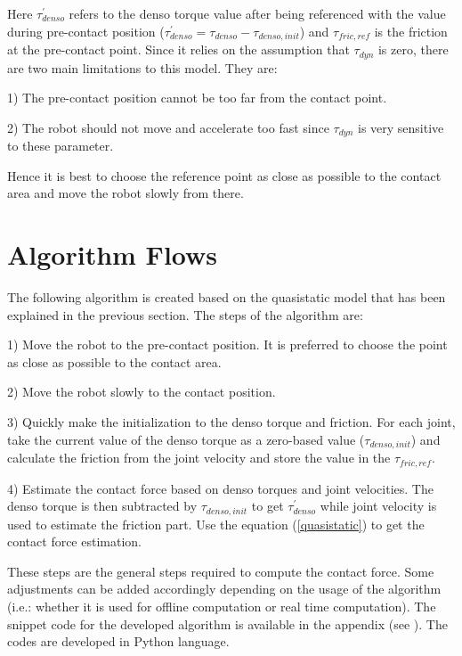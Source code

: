 Here $\tau_{denso}^{\prime}$ refers to the denso torque value after being referenced with the value during pre-contact position ($\tau_{denso}^{\prime} = \tau_{denso} - \tau_{denso , init}$) and $\tau_{fric , ref}$ is the friction at the pre-contact point. Since it relies on the assumption that $\tau_{dyn}$ is zero, there are two main limitations to this model. They are:

1) The pre-contact position cannot be too far from the contact point. 

2) The robot should not move and accelerate too fast since $\tau_{dyn}$ is very sensitive to these parameter.

Hence it is best to choose the reference point as close as possible to the contact area and move the robot slowly from there.

\section{Algorithm Flows}
\label{algorithm}

The following algorithm is created based on the quasistatic model that has been explained in the previous section. The steps of the algorithm are:

1) Move the robot to the pre-contact position. It is preferred to choose the point as close as possible to the contact area.

2) Move the robot slowly to the contact position.

3) Quickly make the initialization to the denso torque and friction. For each joint, take the current value of the denso torque as a zero-based value ($\tau_{denso , init} $) and calculate the friction from the joint velocity and store the value in the $\tau_{fric , ref}$.

4) Estimate the contact force based on denso torques and joint velocities. The denso torque is then subtracted by $\tau_{denso , init}$ to get $\tau_{denso}^{\prime}$ while joint velocity is used to estimate the friction part. Use the equation (\ref{quasistatic}) to get the contact force estimation.

These steps are the general steps required to compute the contact force. Some adjustments can be added accordingly depending on the usage of the algorithm (i.e.: whether it is used for offline computation or real time computation). The snippet code for the developed algorithm is available in the appendix (see ). The codes are developed in Python language.
